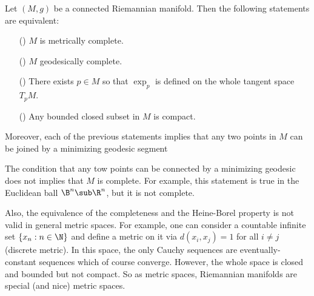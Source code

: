 \begin{theorem}
Let $(M,g)$ be a connected Riemannian manifold. Then the following statements are equivalent:
\begin{itemize}
\item[(\rmnum{1})] $M$ is metrically complete.
\item[(\rmnum{2})] $M$ geodesically complete.
\item[(\rmnum{3})] There exists $p\in M$ so that $\exp_p$ is defined on the whole tangent space $T_pM$.
\item[(\rmnum{4})] Any bounded closed subset in $M$ is compact.
\end{itemize}
Moreover, each of the previous statements implies that any two points in $M$ can be joined by a minimizing geodesic segment
\end{theorem}
\begin{remark}
The condition that any tow points can be connected by a minimizing geodesic does not implies that $M$ is complete. For example, this statement is true in the Euclidean 
ball $\B^n\sub\R^n$, but it is not complete.\par
Also, the equivalence of the completeness and the Heine-Borel property is not valid in general metric spaces. For example, one can consider a countable infinite set 
$\{x_n:n\in\N\}$ and define a metric on it via $d(x_i,x_j)=1$ for all $i\neq j$ (discrete metric). In this space, the only Cauchy sequences are eventually-constant 
sequences which of course converge. However, the whole space is closed and bounded but not compact. So as metric spaces, Riemannian manifolds are special (and nice) 
metric spaces.
\end{remark}
